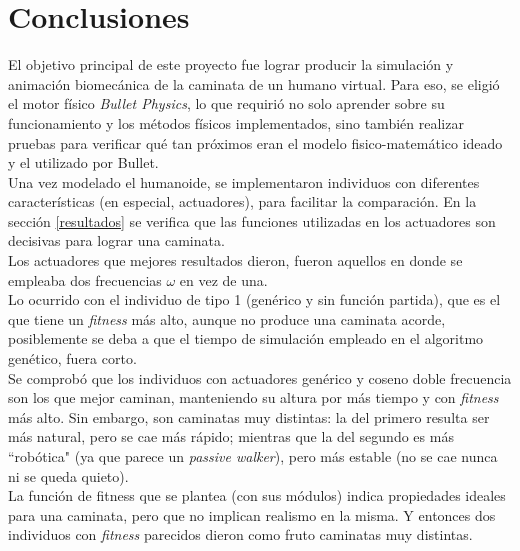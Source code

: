 \documentclass{article}
\begin{document}
\section{Conclusiones}
El objetivo principal de este proyecto fue lograr producir la simulaci\'on y animaci\'on biomec\'anica de la caminata de un humano virtual. Para eso, se eligi\'o el motor f\'isico \textit{Bullet Physics}, lo que requiri\'o no solo aprender sobre su funcionamiento y los m\'etodos f\'isicos implementados, sino tambi\'en realizar pruebas para verificar qu\'e tan pr\'oximos eran el modelo fisico-matem\'atico ideado y el utilizado por Bullet.\\ %
Una vez modelado el humanoide, se implementaron individuos con diferentes caracter\'isticas (en especial, actuadores), para facilitar la comparaci\'on. En la secci\'on \ref{resultados} se verifica que las funciones utilizadas en los actuadores son decisivas para lograr una caminata.\\
Los actuadores que mejores resultados dieron, fueron aquellos en donde se empleaba dos frecuencias $\omega$ en vez de una.\\
Lo ocurrido con el individuo de tipo 1 (gen\'erico y sin funci\'on partida), que es el que tiene un \textit{fitness} m\'as alto, aunque no produce una caminata acorde, posiblemente se deba a que el tiempo de simulaci\'on empleado en el algoritmo gen\'etico, fuera corto.\\
Se comprob\'o que los individuos con actuadores gen\'erico y coseno doble frecuencia son los que mejor caminan, manteniendo su altura por m\'as tiempo y con \textit{fitness} m\'as alto. Sin embargo, son caminatas muy distintas: la del primero resulta ser m\'as natural, pero se cae m\'as r\'apido; mientras que la del segundo es m\'as ``rob\'otica" (ya que parece un \textit{passive walker}), pero m\'as estable (no se cae nunca ni se queda quieto).\\
La funci\'on de fitness que se plantea (con sus m\'odulos) indica propiedades ideales para una caminata, pero que no implican realismo en la misma. Y entonces dos individuos con \textit{fitness} parecidos dieron como fruto caminatas muy distintas.\\
\end{document}
